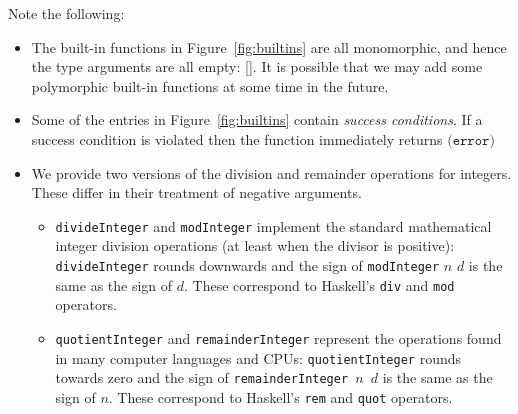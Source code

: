 \documentclass[a4paper]{article}
\newcommand{\keyword}[1]{\texttt{#1}}
\newcommand{\construct}[1]{\texttt{(} #1 \texttt{)}}
\newcommand{\errorU}{\construct{\keyword{error}}}
\begin{document}
Note the following:
\begin{itemize}
\item The built-in functions in Figure~\ref{fig:builtins}
are all monomorphic, and hence the type arguments are all empty: [].
It is possible that we may add some polymorphic built-in functions
at some time in the future.
\item Some of the entries in Figure~\ref{fig:builtins}
  contain \textit{success conditions}.  If a success condition is
  violated then the function immediately returns $\errorU$
\item We provide two versions of the division and remainder operations
  for integers.  These differ in their treatment of negative
  arguments.

  \begin{itemize}

  \item \texttt{divideInteger} and \texttt{modInteger} implement the
    standard mathematical integer division operations (at least when
    the divisor is positive): \texttt{divideInteger} rounds
    downwards and the sign of \texttt{modInteger} $n$ $d$ is the same
    as the sign of $d$.  These correspond to Haskell's \texttt{div}
    and \texttt{mod} operators.

  \item \texttt{quotientInteger} and \texttt{remainderInteger}
    represent the operations found in many computer languages and
    CPUs: \texttt{quotientInteger} rounds towards zero and the sign
    of \texttt{remainderInteger $n$ $d$} is the same as the sign of
    $n$.  These correspond to Haskell's \texttt{rem} and \texttt{quot}
    operators.  \end{itemize}


%
%


\end{itemize}
\end{document}
